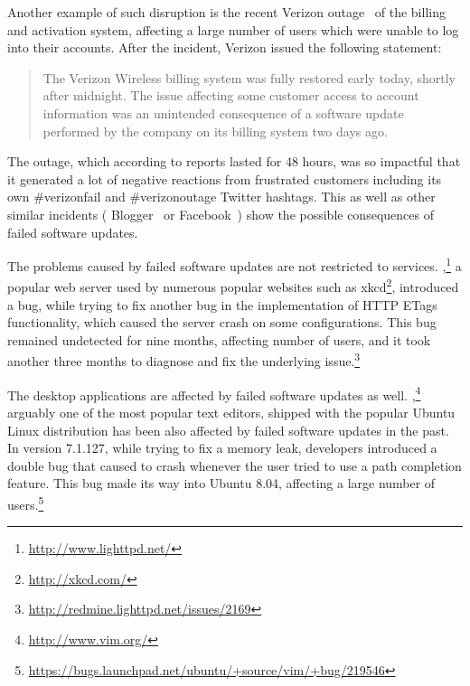 Another example of such disruption is the recent Verizon
outage~\cite{verizon-outage2014} of the billing and activation system,
affecting a large number of users which were unable to log into their accounts.
After the incident, Verizon issued the following statement:
\begin{quotation}
The Verizon Wireless billing system was fully restored early today, shortly
after midnight. The issue affecting some customer access to account information
was an unintended consequence of a software update performed by the company on
its billing system two days ago.
\end{quotation}
The outage, which according to reports lasted for 48 hours, was so impactful
that it generated a lot of negative reactions from frustrated customers
including its own \textsf{\#verizonfail} and \textsf{\#verizonoutage} Twitter
hashtags.  This as well as other similar incidents (\eg
Blogger~\cite{blogger-incident2011} or Facebook~\cite{facebook-incident2010})
show the possible consequences of failed software updates.

The problems caused by failed software updates are not restricted to services.
\lighttpd,\footnote{\url{http://www.lighttpd.net/}} a popular web server used
by numerous popular websites such as xkcd\footnote{\url{http://xkcd.com/}},
introduced a bug, while trying to fix another bug in the implementation of HTTP
ETags functionality, which caused the server crash on some configurations.
This bug remained undetected for nine months, affecting number of users, and it
took another three months to diagnose and fix the underlying
issue.\footnote{\url{http://redmine.lighttpd.net/issues/2169}}

The desktop applications are affected by failed software updates as well.
\vim,\footnote{\url{http://www.vim.org/}} arguably one of the most popular text
editors, shipped with the popular Ubuntu Linux distribution has been also
affected by failed software updates in the past. In version 7.1.127, while
trying to fix a memory leak, \vim developers introduced a double 
bug that caused \vim to crash whenever the user tried to use a path completion
feature.  This bug made its way into Ubuntu 8.04, affecting a large number of
users.\footnote{\url{https://bugs.launchpad.net/ubuntu/+source/vim/+bug/219546}}




